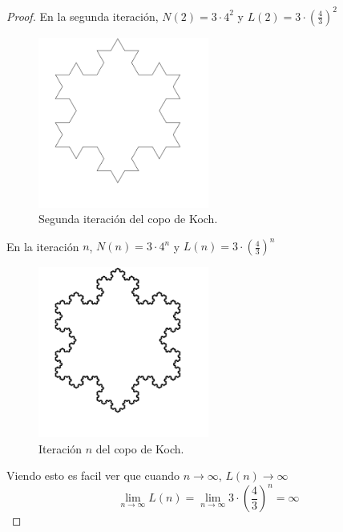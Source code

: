\begin{proof}
    \noindent En la segunda iteración, $N(2) = 3 \cdot 4^2$ y $L(2) = 3 \cdot \left(\frac{4}{3}\right)^2$\\
    
    \begin{figure}[H]
        \centering
        \includegraphics[width=0.5\textwidth]{figures/koch-snowflake-iteration-2.png}
        \caption{Segunda iteración del copo de Koch.}
        \label{fig:koch-snowflake-iteration-2}
    \end{figure}
    
    \noindent En la iteración $n$, $N(n) = 3 \cdot 4^n$ y $L(n) = 3 \cdot \left(\frac{4}{3}\right)^n$\\
    
    \begin{figure}[H]
        \centering
        \includegraphics[width=0.5\textwidth]{figures/koch-snowflake-iteration-n.png}
        \caption{Iteración $n$ del copo de Koch.}
        \label{fig:koch-snowflake-iteration-n}
    \end{figure}
    
    \noindent Viendo esto es facil ver que cuando $n \to \infty$, $L(n) \to \infty$\\
    
    \begin{equation}
        \lim_{n \rightarrow \infty}L(n) = \lim_{n \rightarrow \infty} 3 \cdot \left(\frac{4}{3}\right)^n = \infty
    \end{equation}
    

\end{proof}
